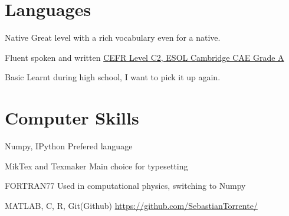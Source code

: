 \documentclass[11pt,a4paper,roman]{moderncv}
\begin{document}




\section{Languages}
	{Native}
	{Great level with a rich vocabulary even for a native.}

	{Fluent spoken and written}
	{\href{https://dl.dropbox.com/u/87894135/StatementOfResult.pdf}
	{CEFR Level C2, ESOL Cambridge CAE Grade A}}

	{Basic}
	{Learnt during high school, I want to pick it up again.}


\section{Computer Skills}

	{Numpy, IPython}
	{Prefered language}

\cvitemwithcomment{\LaTeX}
	{MikTex and Texmaker}
	{Main choice for typesetting}

	{FORTRAN77}
	{Used in computational physics, switching to Numpy}


	{MATLAB, C, R, Git(Github)}
	{\href{https://github.com/SebastianTorrente/}
	{https://github.com/SebastianTorrente/}}
\end{document}

